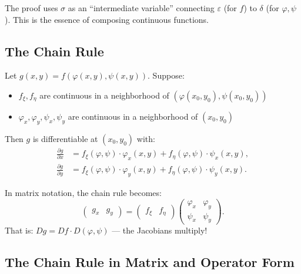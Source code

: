 \documentclass[11pt]{report}
\begin{document}
\begin{remark}
The proof uses $\sigma$ as an ``intermediate variable'' connecting $\varepsilon$ (for $f$) to $\delta$ (for $\varphi, \psi$). This is the essence of composing continuous functions.
\end{remark}

\subsection{The Chain Rule}

\begin{theorem}
Let $g(x,y) = f(\varphi(x,y), \psi(x,y))$. Suppose:
\begin{itemize}[itemsep=2pt]
    \item $f_\xi, f_\eta$ are continuous in a neighborhood of $(\varphi(x_0, y_0), \psi(x_0, y_0))$
    \item $\varphi_x, \varphi_y, \psi_x, \psi_y$ are continuous in a neighborhood of $(x_0, y_0)$
\end{itemize}
Then $g$ is differentiable at $(x_0, y_0)$ with:
\begin{align*}
\frac{\partial g}{\partial x} &= f_\xi(\varphi, \psi) \cdot \varphi_x(x,y) + f_\eta(\varphi, \psi) \cdot \psi_x(x,y), \\[6pt]
\frac{\partial g}{\partial y} &= f_\xi(\varphi, \psi) \cdot \varphi_y(x,y) + f_\eta(\varphi, \psi) \cdot \psi_y(x,y).
\end{align*}
\end{theorem}

\begin{remark}
In matrix notation, the chain rule becomes:
\[
\begin{pmatrix} g_x & g_y \end{pmatrix} = \begin{pmatrix} f_\xi & f_\eta \end{pmatrix} \begin{pmatrix} \varphi_x & \varphi_y \\ \psi_x & \psi_y \end{pmatrix}.
\]
That is: $Dg = Df \cdot D(\varphi, \psi)$ — the Jacobians multiply!
\end{remark}

\subsection{The Chain Rule in Matrix and Operator Form}
\end{document}
